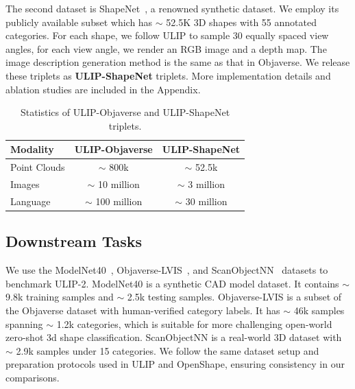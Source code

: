 \documentclass[10pt,twocolumn,letterpaper]{article}
\newcommand{\ning}[1]{\textcolor{blue}{Ning: #1}}
\begin{document}
The second dataset is ShapeNet~\citep{chang2015shapenet}, a renowned synthetic dataset. We employ its publicly available subset which has $\sim$ 52.5K 3D shapes with 55 annotated categories. For each shape, we follow ULIP to sample 30 equally spaced view angles, for each view angle, we render an RGB image and a depth map. The image description generation method is the same as that in Objaverse. We release these triplets as \textbf{ULIP-ShapeNet} triplets. More implementation details and ablation studies are included in the Appendix.

\begin{table}[t]
  \small
  \centering
  \begin{tabular}{lcc}
    \toprule
    \textbf{Modality} & \textbf{ULIP-Objaverse} & \textbf{ULIP-ShapeNet} \\
    \midrule
    Point Clouds & $\sim$ 800k & $\sim$ 52.5k \\
    Images & $\sim$ 10 million & $\sim$ 3 million \\
    Language & $\sim$ 100 million & $\sim$ 30 million \\
    \bottomrule
  \end{tabular}
  \caption{Statistics of ULIP-Objaverse and ULIP-ShapeNet triplets.}
    \label{table:triplet_stats}
    \vspace{-4mm}
\end{table}

\subsection{Downstream Tasks}

We use the ModelNet40~\citep{chang2015shapenet}, Objaverse-LVIS~\citep{Deitke2022objaverse}, and ScanObjectNN~\citep{Uy_2019_ICCV} datasets to benchmark ULIP-2. ModelNet40 is a synthetic CAD model dataset. It contains $\sim$ 9.8k training samples and $\sim$ 2.5k testing samples. Objaverse-LVIS is a subset of the Objaverse dataset with human-verified category labels. It has $\sim$ 46k samples spanning $\sim$ 1.2k categories, which is suitable for more challenging open-world zero-shot 3d shape classification. ScanObjectNN is a real-world 3D dataset with $\sim$ 2.9k samples under 15 categories. We follow the same dataset setup and preparation protocols used in ULIP and OpenShape, ensuring consistency in our comparisons.
\end{document}
